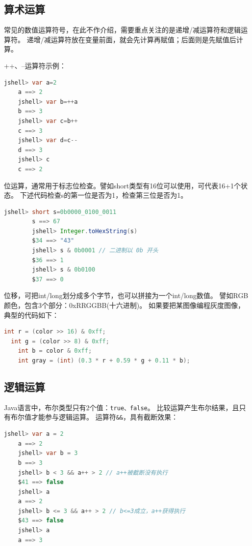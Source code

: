 \subsection{算术运算}
常见的数值运算符号，在此不作介绍，需要重点关注的是递增/减运算符和逻辑运算符。
递增/减运算符放在变量前面，就会先计算再赋值；后面则是先赋值后计算。
\begin{example} ++、--运算符示例：
\begin{lstlisting}[language=Java, backgroundcolor=\color{lightgray!10}]
	jshell> var a=2
	a ==> 2
	jshell> var b=++a
	b ==> 3
	jshell> var c=b++
	c ==> 3
	jshell> var d=c--
	d ==> 3
	jshell> c
	c ==> 2
\end{lstlisting}
\end{example}

位运算，通常用于标志位检查。譬如short类型有16位可以使用，可代表16+1个状态。
下述代码检查s的第一位是否为1，检查第三位是否为1。
\begin{example}
	\begin{lstlisting}[language=Java, backgroundcolor=\color{lightgray!10}]
		jshell> short s=0b0000_0100_0011
		s ==> 67
		jshell> Integer.toHexString(s)
		$34 ==> "43"
		jshell> s & 0b0001 // 二进制以 0b 开头
		$36 ==> 1
		jshell> s & 0b0100
		$37 ==> 0
	\end{lstlisting}
\end{example}

位移，可把int/long划分成多个字节，也可以拼接为一个int/long数值。
譬如RGB颜色，包含3个部分：0xRRGGBB(十六进制)。
如果要把某图像编程灰度图像，典型的代码如下：

\begin{lstlisting}[language=Java]
	int r = (color >> 16) & 0xff;
  int g = (color >> 8) & 0xff;
	int b = color & 0xff;
	int gray = (int) (0.3 * r + 0.59 * g + 0.11 * b);
\end{lstlisting}


\subsection{逻辑运算}
Java语言中，布尔类型只有2个值：\lstinline[language=Java]{true、false}。
比较运算产生布尔结果，且只有布尔值才能参与逻辑运算。
运算符\lstinline{&&}，具有截断效果：

\begin{lstlisting}[language=Java]
	jshell> var a = 2
	a ==> 2
	jshell> var b = 3
	b ==> 3
	jshell> b < 3 && a++ > 2 // a++被截断没有执行
	$41 ==> false
	jshell> a
	a ==> 2
	jshell> b <= 3 && a++ > 2 // b<=3成立，a++获得执行
	$43 ==> false
	jshell> a
	a ==> 3
\end{lstlisting}

